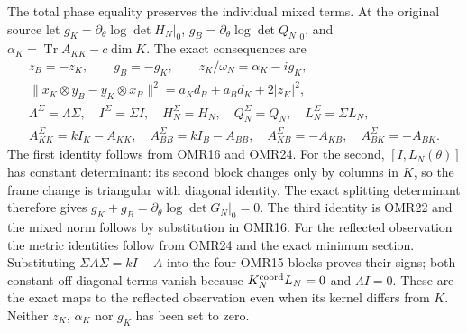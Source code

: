 \documentclass[11pt,a4paper]{article}
\begin{document}
The total phase equality preserves the individual mixed terms.
At the original source let
$g_K=\partial_\theta\log\det H_N|_0$,
$g_B=\partial_\theta\log\det Q_N|_0$, and
$\alpha_K=\operatorname{Tr}A_{KK}-c\dim K$.
The exact consequences are
\[
 \begin{gathered}
 z_B=-z_K,\qquad g_B=-g_K,\qquad
 z_K/\omega_N=\alpha_K-ig_K,\\
 \|x_K\otimes y_B-y_K\otimes x_B\|^2
           =a_Kd_B+a_Bd_K+2|z_K|^2,\\
 \Lambda^\Sigma=\Lambda\Sigma,\quad I^\Sigma=\Sigma I,\quad
 H_N^\Sigma=H_N,\quad Q_N^\Sigma=Q_N,\quad L_N^\Sigma=\Sigma L_N,\\
 A_{KK}^\Sigma=kI_K-A_{KK},\quad
 A_{BB}^\Sigma=kI_B-A_{BB},\quad
 A_{KB}^\Sigma=-A_{KB},\quad A_{BK}^\Sigma=-A_{BK}.
 \end{gathered}\tag{OMR25}
\]
The first identity follows from OMR16 and OMR24. For the second,
$[I,L_N(\theta)]$ has constant determinant: its second block
changes only by columns in $K$, so the frame change is triangular
with diagonal identity. The exact splitting determinant therefore
gives $g_K+g_B=\partial_\theta\log\det G_N|_0=0$.
The third identity is OMR22 and the mixed norm follows by
substitution in OMR16. For the reflected observation the metric
identities follow from OMR24 and the exact minimum section.
Substituting $\Sigma A\Sigma=kI-A$ into the four OMR15 blocks
proves their signs; both constant off-diagonal terms vanish
because $K_N^{\rm coord}L_N=0$ and $\Lambda I=0$.
These are the exact maps to the reflected observation even when
its kernel differs from $K$. Neither $z_K$, $\alpha_K$ nor $g_K$
has been set to zero.
\end{document}
